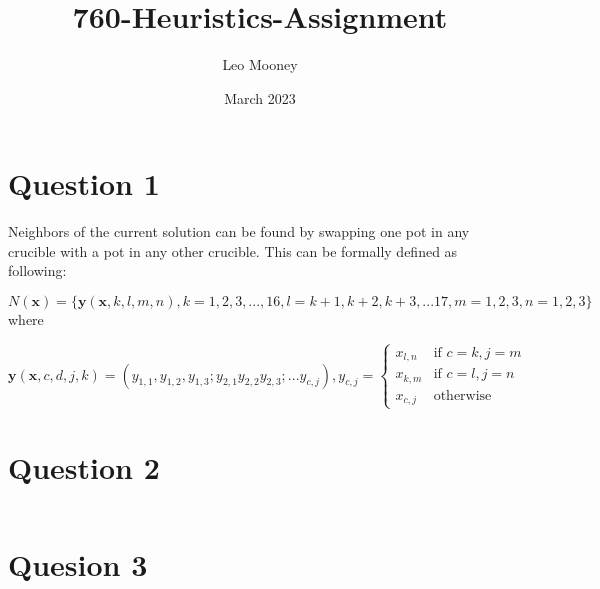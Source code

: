 \documentclass{article}
\title{760-Heuristics-Assignment}
\author{Leo Mooney}
\date{March 2023}
\begin{document}
\maketitle

\section{Question 1}
Neighbors of the current solution can be found by swapping one pot in
any crucible with a pot in any other crucible.
This can be formally defined as following:

$N(\mathbf{x}) = \{\mathbf{y}(\mathbf{x}, k, l, m, n), k=1,2,3,...,16, 
l=k+1,k+2,k+3,...17, m=1,2,3, n=1,2,3\}$ where

$$\mathbf{y}(\mathbf{x},c,d,j,k)=(y_{1, 1},y_{1, 2},y_{1, 3};
y_{2, 1}y_{2, 2}y_{2, 3};...y_{c, j}),y_{c,j}=
\begin{cases}
    x_{l, n} & \text{if } c=k,j=m \\
    x_{k, m} & \text{if } c=l,j=n \\
    x_{c,j} & \text{otherwise}
\end{cases}$$

\section{Question 2}
\begin{verbatim}
\end{verbatim}

\section{Quesion 3}
\end{document}
